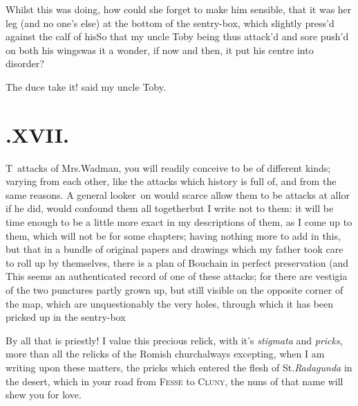 \documentclass{article}
\begin{document}
Whilst this was doing, how could she forget to make him
sensible, that it was her leg (and no one’s else) at the
bottom of the sentry-box, which slightly press’d against the
calf of his\tsh So that my uncle Toby being thus
attack’d and sore push’d on both his
wings\tsh was it a wonder, if now and then, it put his
centre into disorder?\tsh

\tsh The duce take it! said my uncle Toby.

\vfill{}\eject\null\smallskip
\section{.\enspace XVII.}

\lettrine{T}{\,} attacks of Mrs.\@ Wadman,
you will readily conceive to be of different kinds; varying from
each other, like the attacks which history is full of, and from the
same reasons. A general looker~on would scarce allow them to be
attacks at all\tsh or if he did, would confound them all
together\tsh but I write not to them: it will be time
enough to be a little more exact in my descriptions of them, as I
come up to them, which will not be for some chapters; having
nothing more to add in this, but that in a bundle of original
papers and drawings which my father took care to roll up by
themselves, there is a plan of
Bouchain in perfect preservation (and
This seems an
authenticated record of one of these attacks; for there are
vestigia of the two punctures partly grown up, but still visible on
the opposite corner of the map, which are unquestionably the very
holes, through which it has been pricked up in the
sentry-box\tsh

By all that is priestly! I value this precious relick, with it’s
\textit{stigmata} and
\textit{pricks}, more than all the relicks of the
Romish church\tsh always excepting, when I am
writing upon these matters, the pricks which entered the flesh of
St.\@ \textit{Radagunda} in the desert, which in your road from
\textsc{Fesse} to \textsc{Cluny}, the nuns of that name
will shew you for love.
\end{document}
